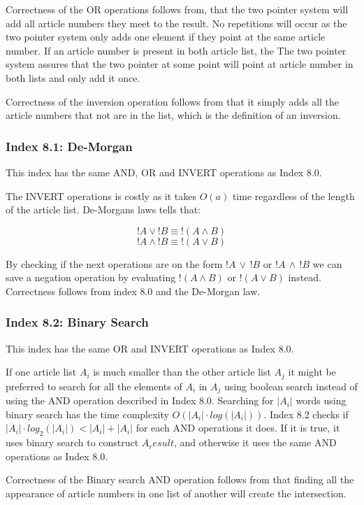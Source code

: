 Correctness of the OR operations follows from, that the two pointer system will add all article numbers they meet to the result. No repetitions will occur as the two pointer system only adds one element if they point at the same article number. If an article number is present in both article list, the The two pointer system assures that the two pointer at some point will point at article number in both lists  and only add it once.

Correctness of the inversion operation follows from that it simply adds all the article numbers that not are in the list, which is the definition of an inversion.

\subsubsection{Index 8.1: De-Morgan}
This index has the same AND, OR and INVERT operations as Index 8.0.

The INVERT operations is costly as it takes $O(a)$ time regardless of the length of the article list. De-Morgans laws tells that:

$$!A \vee ! B \equiv !(A \wedge B)$$
$$!A \wedge ! B \equiv !(A \vee B)$$

By checking if the next operations are on the form $!A\, \vee\, !B$ or $!A\, \wedge\, ! B$ we can save a negation operation by evaluating $!(A \wedge B)$ or $!(A \vee B)$ instead. Correctness follows from index 8.0 and the De-Morgan law.

\subsubsection{Index 8.2: Binary Search}
This index has the same OR and INVERT operations as Index 8.0.

If one article list $A_i$ is much smaller than the other article list $A_j$ it might be preferred to search for all the elements of $A_i$ in $A_j$ using boolean search instead of using the AND operation described in Index 8.0. Searching for $|A_i|$ words using binary search has the time complexity $O(|A_i| \cdot log(|A_i|))$. Index 8.2 checks if $|A_i| \cdot log_2(|A_i|) < |A_i| + |A_i|$ for each AND operations it does. If it is true, it uses binary search to construct $A_result$, and otherwise it uses the same AND operations as Index 8.0.

Correctness of the Binary search AND operation follows from that finding all the appearance of article numbers in one list of another will create the intersection.

